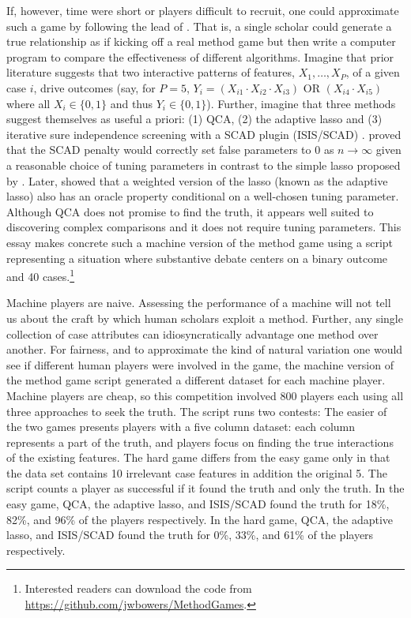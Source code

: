 \documentclass[12pt]{article}
\begin{document}
If, however, time were short or players difficult to recruit, one could
approximate such a game by following the lead of \citet{lucasfk2014}. That is,
a single scholar could generate a true relationship as if kicking off a real
method game but then write a computer program to compare the effectiveness of
different algorithms. Imagine that prior literature suggests that two
interactive patterns of features, $X_1, \ldots, X_P$, of a given case $i$,
drive outcomes (say, for $P=5$, $Y_i= (X_{i1} \cdot X_{i2} \cdot X_{i3} )
\text{ OR } ( X_{i4} \cdot X_{i5} )$ where all $X_i  \in \{0,1\}$ and thus
$Y_i \in \{0,1\}$).  Further, imagine that three methods suggest themselves as
useful a priori: (1) QCA, (2) the adaptive lasso and (3) iterative sure
independence screening with a SCAD plugin (ISIS/SCAD) \citep{fan2008sure}.
\citet{fan2001variable} proved that the SCAD penalty would correctly set false
parameters to 0 as $n \rightarrow \infty$ given a reasonable choice of tuning
parameters in contrast to the simple lasso proposed by
\cite{tibshirani1996regression}.  Later, \citet{zou2006adaptive} showed that a
weighted version of the lasso (known as the adaptive lasso) also has an oracle
property conditional on a well-chosen tuning parameter. Although QCA does not
promise to find the truth, it appears well suited to discovering complex
comparisons and it does not require tuning parameters.  This essay makes
concrete such a machine version of the method game using a script representing
a situation where substantive debate centers on a binary outcome and 40
cases.\footnote{Interested readers can download the code from
  \url{https://github.com/jwbowers/MethodGames}.}


Machine players are naive. Assessing the performance of a machine will not
tell us about the craft by which human scholars exploit a method.  Further,
any single collection of case attributes can idiosyncratically advantage one
method over another. For fairness, and to approximate the kind of natural
variation one would see if different human players were involved in the game,
the machine version of the method game script generated a different dataset
for each machine player.  Machine players are cheap, so this competition
involved 800 players each using all three approaches to seek the truth.  The
script runs two contests: The easier of the two games presents players with a
five column dataset: each column represents a part of the truth, and players
focus on finding the true interactions of the existing features.  The hard
game differs from the easy game only in that the data set contains 10
irrelevant case features in addition the original 5.  The script counts a
player as successful if it found the truth and only the truth. In the easy
game, QCA, the adaptive lasso, and ISIS/SCAD found the truth for 18\%, 82\%,
and 96\% of the players respectively. In the hard game, QCA, the adaptive
lasso, and ISIS/SCAD found the truth for 0\%, 33\%, and 61\% of the players
respectively.
\end{document}
